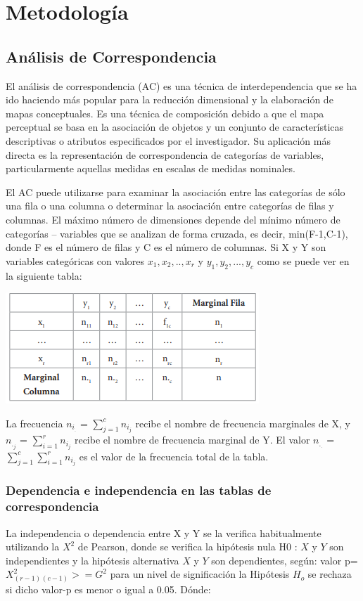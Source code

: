 \documentclass[11pt,letter]{article}
\begin{document}
\section{Metodología}
\subsection{Análisis de Correspondencia}
El análisis de correspondencia
(AC) es una técnica de interdependencia que se ha ido haciendo más
popular para la reducción dimensional y la elaboración de mapas conceptuales. Es una técnica de composición debido a que el mapa perceptual se basa en la asociación de objetos y
un conjunto de características descriptivas o atributos especificados por
el investigador. Su aplicación más
directa es la representación de correspondencia de categorías de variables,
particularmente aquellas medidas en
escalas de medidas nominales.\autocite{guale2012modelo}

El AC puede utilizarse para examinar la asociación entre las categorías de sólo una fila o una columna
o determinar la asociación entre categorías de filas y columnas. El máximo número de dimensiones depende
del mínimo número de categorías
– variables que se analizan de forma
cruzada, es decir, min(F-1,C-1), donde F es el número de filas y C es el
número de columnas. Si X y Y son
variables categóricas con valores {$x_1,x_2,..,x_r$} y ${y_1,y_2,...,y_c}$ como se puede ver en la siguiente tabla:

\begin{table}[!htb]
    \includegraphics{tabla_corres.png}
    \label{tab1}
\end{table}


La frecuencia $n_i_.$ = $\sum_{j=1}^{c}n_i_j$ 
recibe  el  nombre  de  frecuencia marginales de X, y     $n_._j$ = $\sum_{i=1}^{r}n_i_j$ recibe
el nombre de frecuencia marginal de
Y. El valor $n_._.$ = $\sum_{j=1}^{c}\sum_{i=1}^{r}n_i_j$ es el valor
de la frecuencia total de la tabla.
\subsubsection{Dependencia e independencia
en las tablas de correspondencia} 
La independencia o dependencia
entre X y Y se la verifica habitualmente utilizando la $X^2$
 de Pearson, donde
se verifica la hipótesis nula H0
: $X$ y $Y$
son independientes y la hipótesis alternativa $X$ y $Y$ son dependientes, según: valor p=$X^2_(r-1)_(c-1) >= G^2$ para
un nivel de significación la Hipótesis
$H_o$ se rechaza si dicho valor-p es
menor o igual a 0.05. Dónde:
\end{document}
